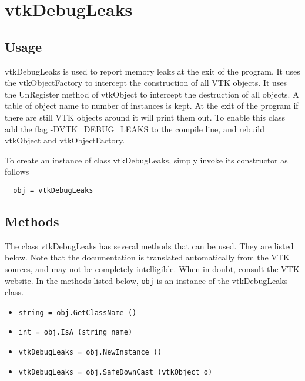 \section{vtkDebugLeaks}

\subsection{Usage}

 vtkDebugLeaks is used to report memory leaks at the exit of the program.
 It uses the vtkObjectFactory to intercept the construction of all VTK
 objects. It uses the UnRegister method of vtkObject to intercept the
 destruction of all objects. A table of object name to number of instances
 is kept. At the exit of the program if there are still VTK objects around
 it will print them out.  To enable this class add the flag
 -DVTK\_DEBUG\_LEAKS to the compile line, and rebuild vtkObject and
 vtkObjectFactory.

To create an instance of class vtkDebugLeaks, simply
invoke its constructor as follows
\begin{verbatim}
  obj = vtkDebugLeaks
\end{verbatim}
\subsection{Methods}

The class vtkDebugLeaks has several methods that can be used.
  They are listed below.
Note that the documentation is translated automatically from the VTK sources,
and may not be completely intelligible.  When in doubt, consult the VTK website.
In the methods listed below, \verb|obj| is an instance of the vtkDebugLeaks class.
\begin{itemize}
\item  \verb|string = obj.GetClassName ()|

\item  \verb|int = obj.IsA (string name)|

\item  \verb|vtkDebugLeaks = obj.NewInstance ()|

\item  \verb|vtkDebugLeaks = obj.SafeDownCast (vtkObject o)|

\end{itemize}

